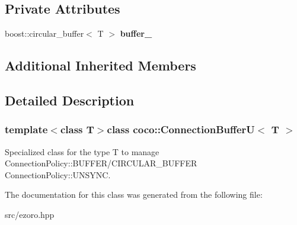 \subsection*{Private Attributes}
\begin{DoxyCompactItemize}
\item 
\hypertarget{classcoco_1_1_connection_buffer_u_af9c42ab03e1318e1adebc63fd598415b}{boost\-::circular\-\_\-buffer$<$ T $>$ {\bfseries buffer\-\_\-}}\label{classcoco_1_1_connection_buffer_u_af9c42ab03e1318e1adebc63fd598415b}

\end{DoxyCompactItemize}
\subsection*{Additional Inherited Members}


\subsection{Detailed Description}
\subsubsection*{template$<$class T$>$class coco\-::\-Connection\-Buffer\-U$<$ T $>$}

Specialized class for the type T to manage Connection\-Policy\-::\-B\-U\-F\-F\-E\-R/\-C\-I\-R\-C\-U\-L\-A\-R\-\_\-\-B\-U\-F\-F\-E\-R Connection\-Policy\-::\-U\-N\-S\-Y\-N\-C. 

The documentation for this class was generated from the following file\-:\begin{DoxyCompactItemize}
\item 
src/ezoro.\-hpp\end{DoxyCompactItemize}
